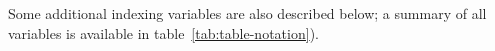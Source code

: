 \documentclass[11pt]{article}
\begin{document}
Some additional indexing variables are also described below;
a summary of all variables is available in table~\ref{tab:table-notation}). 




\end{document}
